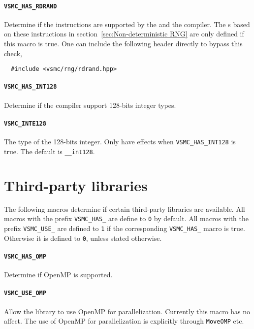 \paragraph{\texttt{VSMC\_HAS\_RDRAND}} Determine if the \rdrand instructions
are supported by the \cpu and the compiler. The \rng{}s based on these
instructions in section~\ref{sec:Non-deterministic RNG} are only defined if
this macro is true. One can include the following header directly to bypass
this check,
\begin{Verbatim}
  #include <vsmc/rng/rdrand.hpp>
\end{Verbatim}

\paragraph{\texttt{VSMC\_HAS\_INT128}} Determine if the compiler support
128-bits integer types.

\paragraph{\texttt{VSMC\_INTE128}} The type of the 128-bits integer. Only have
effects when \verb|VSMC_HAS_INT128| is true. The default is \verb|__int128|.

\section{Third-party libraries}
\label{sec:Third-party libraries}

The following macros determine if certain third-party libraries are available.
All macros with the prefix \verb|VSMC_HAS_| are define to \verb|0| by default.
All macros with the prefix \verb|VSMC_USE_| are defined to \verb|1| if the
corresponding \verb|VSMC_HAS_| macro is true. Otherwise it is defined to
\verb|0|, unless stated otherwise.

\paragraph{\texttt{VSMC\_HAS\_OMP}} Determine if OpenMP is supported.

\paragraph{\texttt{VSMC\_USE\_OMP}} Allow the library to use OpenMP for
parallelization. Currently this macro has no affect. The use of OpenMP for
parallelization is explicitly through \verb|MoveOMP| etc.

